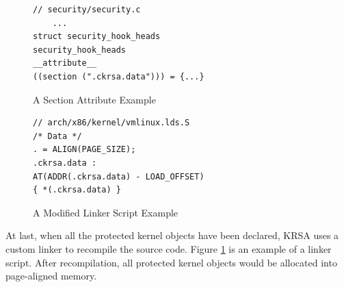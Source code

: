 \documentclass[conference]{IEEEtran}
\begin{document}
\begin{figure}[!htbp]
    \begin{minipage}[t]{0.5\linewidth}
{\tt \small \begin{verbatim}
// security/security.c
    ...
struct security_hook_heads 
security_hook_heads
__attribute__ 
((section (".ckrsa.data"))) = {...} \end{verbatim}
}
    \caption{A Section Attribute Example}
    \label{declare}
\end{minipage}
\begin{minipage}[t]{0.5\linewidth}
{\tt \small \begin{verbatim}
// arch/x86/kernel/vmlinux.lds.S
/* Data */
. = ALIGN(PAGE_SIZE);
.ckrsa.data : 
AT(ADDR(.ckrsa.data) - LOAD_OFFSET)
{ *(.ckrsa.data) }
\end{verbatim}}
    \caption{A Modified Linker Script Example}
     \label{linker}
\end{minipage}
\end{figure}


%
At last, when all the protected kernel objects have been declared, KRSA uses a custom linker to recompile the source code. Figure \ref{linker} is an example of a linker script. After recompilation, all protected kernel objects would be allocated into page-aligned memory. 

%
\end{document}
